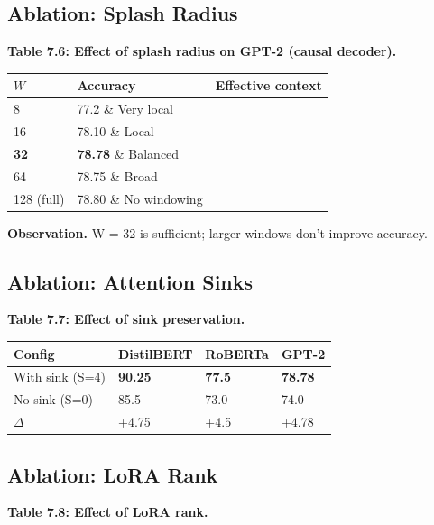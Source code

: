 \subsection{Ablation: Splash Radius}

\textbf{Table 7.6: Effect of splash radius on GPT-2 (causal decoder).}

\begin{table}[H]
\centering
\small
\begin{tabular}{lll}
\toprule
\textbf{$W$} & \textbf{Accuracy} & \textbf{Effective context} \\
\midrule
8 & 77.2 \& Very local \\
16 & 78.10 \& Local \\
\textbf{32} & \textbf{78.78} \& Balanced \\
64 & 78.75 \& Broad \\
128 (full) & 78.80 \& No windowing \\
\bottomrule
\end{tabular}
\end{table}

\textbf{Observation.} W = 32 is sufficient; larger windows don't improve accuracy.

\subsection{Ablation: Attention Sinks}

\textbf{Table 7.7: Effect of sink preservation.}

\begin{table}[H]
\centering
\small
\begin{tabular}{llll}
\toprule
\textbf{Config} & \textbf{DistilBERT} & \textbf{RoBERTa} & \textbf{GPT-2} \\
\midrule
With sink (S=4) & \textbf{90.25} & \textbf{77.5} & \textbf{78.78} \\
No sink (S=0) & 85.5 & 73.0 & 74.0 \\
$\Delta$ & +4.75 & +4.5 & +4.78 \\
\bottomrule
\end{tabular}
\end{table}

\subsection{Ablation: LoRA Rank}

\textbf{Table 7.8: Effect of LoRA rank.}

